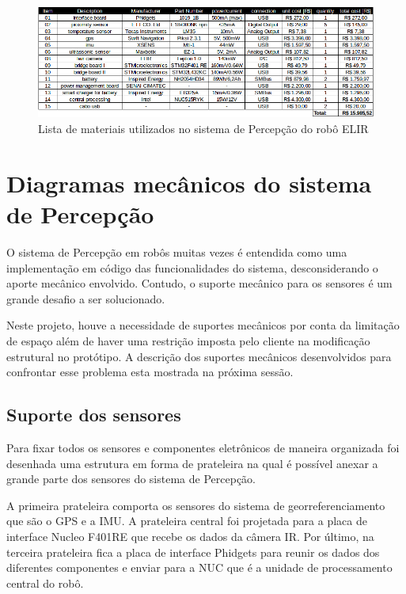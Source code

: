 \begin{figure}[h]
	\centering
	\includegraphics[width=16cm]{Figures/lista_materiais.png}
	\caption{Lista de materiais utilizados no sistema de Percepção do robô ELIR}
	\label{fig:list_mat}
\end{figure}


\section{Diagramas mecânicos do sistema de Percepção}
\label{sec:diagm}

O sistema de Percepção em robôs muitas vezes é entendida como uma implementação em código das funcionalidades do sistema, desconsiderando o aporte mecânico envolvido. Contudo, o suporte mecânico para os sensores é um grande desafio a ser solucionado. 

Neste projeto, houve a necessidade de suportes mecânicos por conta da limitação de espaço além de haver uma restrição imposta pelo cliente na modificação estrutural no protótipo. A descrição dos suportes mecânicos desenvolvidos para confrontar esse problema esta mostrada na próxima sessão.
%

\subsection{Suporte dos sensores}

Para  fixar  todos  os  sensores  e  componentes  eletrônicos  de  maneira  organizada foi desenhada uma estrutura em forma de prateleira  na qual é possível anexar a grande parte dos sensores do sistema de Percepção.

 A primeira prateleira comporta os sensores do sistema de georreferenciamento que são o GPS e a IMU. A prateleira central foi projetada para a placa de interface Nucleo F401RE que recebe os dados da câmera IR. Por último, na terceira prateleira fica a placa de interface Phidgets para reunir os dados dos diferentes componentes e enviar para a NUC que é a  unidade de processamento central do robô.


